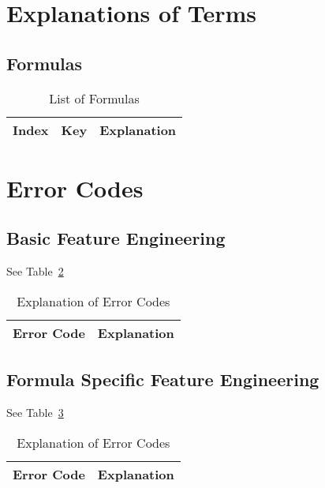 \documentclass[letterpaper,12pt]{article}
\begin{document}
\section{Explanations of Terms}
\subsection{Formulas}

\begin{table}
  \centering
  \begin{tabular}{|l|l|l|} \hline \hline
    {\bf Index} & {\bf Key} & {\bf Explanation} \\ \hline 
     
    \hline
  \end{tabular}
  \caption{List of Formulas}
  \label{tbl_formulas}
\end{table}

\section{Error Codes}

\subsection{Basic Feature Engineering}
See Table~\ref{explanation_plp1_errs}
\begin{table}
  \centering
  \begin{tabular}{|l|l|} \hline \hline
    {\bf Error Code} & {\bf Explanation} \\ \hline  \hline
    
    \hline
  \end{tabular}
  \label{explanation_plp1_errs}
  \caption{Explanation of Error Codes}
\end{table}

\subsection{Formula Specific Feature Engineering}

See Table~\ref{explanation_plp2_errs}
\begin{table}
  \centering
  \begin{tabular}{|l|l|} \hline \hline
    {\bf Error Code} & {\bf Explanation} \\ \hline  \hline
    
    \hline
  \end{tabular}
  \label{explanation_plp2_errs}
  \caption{Explanation of Error Codes}
\end{table}
\end{document}
